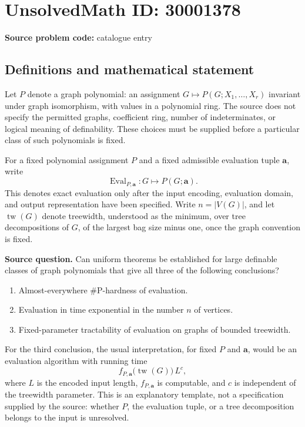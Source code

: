 \documentclass[11pt]{article}
\begin{document}
\section*{UnsolvedMath ID: 30001378}
\textbf{Source problem code:} catalogue entry
\subsection{Definitions and mathematical statement}
Let \(P\) denote a graph polynomial: an assignment \(G\mapsto P(G;X_1,\ldots,X_r)\) invariant under graph isomorphism, with values in a polynomial ring. The source does not specify the permitted graphs, coefficient ring, number of indeterminates, or logical meaning of definability. These choices must be supplied before a particular class of such polynomials is fixed.

For a fixed polynomial assignment \(P\) and a fixed admissible evaluation tuple \(\mathbf a\), write
\[
\operatorname{Eval}_{P,\mathbf a}:G\longmapsto P(G;\mathbf a).
\]
This denotes exact evaluation only after the input encoding, evaluation domain, and output representation have been specified. Write \(n=|V(G)|\), and let \(\operatorname{tw}(G)\) denote treewidth, understood as the minimum, over tree decompositions of \(G\), of the largest bag size minus one, once the graph convention is fixed.

\textbf{Source question.} Can uniform theorems be established for large definable classes of graph polynomials that give all three of the following conclusions?
\begin{enumerate}
\item Almost-everywhere \(\#\mathrm{P}\)-hardness of evaluation.
\item Evaluation in time exponential in the number \(n\) of vertices.
\item Fixed-parameter tractability of evaluation on graphs of bounded treewidth.
\end{enumerate}

For the third conclusion, the usual interpretation, for fixed \(P\) and \(\mathbf a\), would be an evaluation algorithm with running time
\[
f_{P,\mathbf a}\bigl(\operatorname{tw}(G)\bigr)\,L^c,
\]
where \(L\) is the encoded input length, \(f_{P,\mathbf a}\) is computable, and \(c\) is independent of the treewidth parameter. This is an explanatory template, not a specification supplied by the source: whether \(P\), the evaluation tuple, or a tree decomposition belongs to the input is unresolved.
\end{document}
